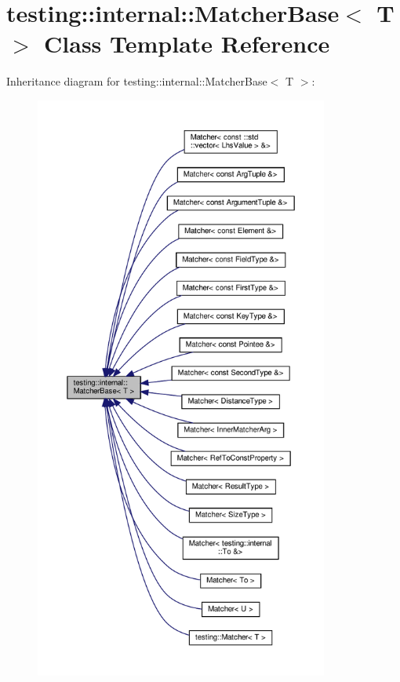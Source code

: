 \hypertarget{classtesting_1_1internal_1_1_matcher_base}{}\section{testing\+:\+:internal\+:\+:Matcher\+Base$<$ T $>$ Class Template Reference}
\label{classtesting_1_1internal_1_1_matcher_base}


Inheritance diagram for testing\+:\+:internal\+:\+:Matcher\+Base$<$ T $>$\+:
\nopagebreak
\begin{figure}[H]
\begin{center}
\leavevmode
\includegraphics[height=550pt]{classtesting_1_1internal_1_1_matcher_base__inherit__graph}
\end{center}
\end{figure}
